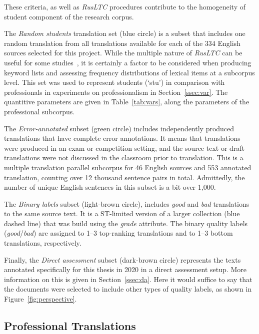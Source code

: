 These criteria, as well as \textit{RusLTC} procedures contribute to the homogeneity of student component of the research corpus. 

The \textit{Random students} translation set (blue circle) is a subset that includes one random translation from all translations available for each of the 334 English sources selected for this project. While the multiple nature of \textit{RusLTC} can be useful for some studies~\cite[see][]{Castagnoli2009}, it is certainly a factor to be considered when producing keyword lists and assessing frequency distributions of lexical items at a subcorpus level. This set was used to represent students (`stu') in comparison with professionals in experiments on professionalism in Section~\ref{ssec:var}. The quantitive parameters are given in Table~\ref{tab:vars}, along the parameters of the professional subcorpus.

The \textit{Error-annotated} subset (green circle) includes independently produced translations that have complete error annotations. It means that translations were produced in an exam or competition setting, and the source text or draft translations were not discussed in the classroom prior to translation. This is a multiple translation parallel subcorpus for 46 English sources and 553 annotated translation, counting over 12 thousand sentence pairs in total. Admittedly, the number of unique English sentences in this subset is a bit over 1,000.

The \textit{Binary labels} subset (light-brown circle), includes \textit{good} and \textit{bad} translations to the same source text. It is a ST-limited version of a larger collection (blue dashed line) that was build using the \textit{grade} attribute. The binary quality labels (\textit{good}/\textit{bad}) are assigned to 1--3 top-ranking translations and to 1--3 bottom translations, respectively.

Finally, the \textit{Direct assessment} subset (dark-brown circle) represents the texts annotated specifically for this thesis in 2020 in a direct assessment setup. More information on this is given in Section~\ref{ssec:da}. Here it would suffice to say that the documents were selected to include other types of quality labels, as shown in Figure~\ref{fig:perspective}.

\subsection{\label{ssec:mypro}Professional Translations}

